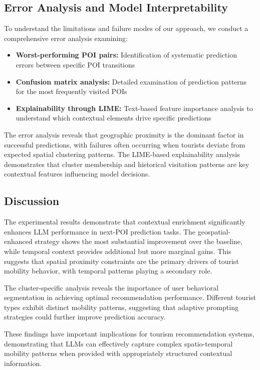 \documentclass[12pt,a4paper]{article}
\begin{document}
\subsection{Error Analysis and Model Interpretability}

To understand the limitations and failure modes of our approach, we conduct a comprehensive error analysis examining:

\begin{itemize}
\item \textbf{Worst-performing POI pairs:} Identification of systematic prediction errors between specific POI transitions
\item \textbf{Confusion matrix analysis:} Detailed examination of prediction patterns for the most frequently visited POIs
\item \textbf{Explainability through LIME:} Text-based feature importance analysis to understand which contextual elements drive specific predictions
\end{itemize}

The error analysis reveals that geographic proximity is the dominant factor in successful predictions, with failures often occurring when tourists deviate from expected spatial clustering patterns. The LIME-based explainability analysis demonstrates that cluster membership and historical visitation patterns are key contextual features influencing model decisions.

\subsection{Discussion}

The experimental results demonstrate that contextual enrichment significantly enhances LLM performance in next-POI prediction tasks. The geospatial-enhanced strategy shows the most substantial improvement over the baseline, while temporal context provides additional but more marginal gains. This suggests that spatial proximity constraints are the primary drivers of tourist mobility behavior, with temporal patterns playing a secondary role.

The cluster-specific analysis reveals the importance of user behavioral segmentation in achieving optimal recommendation performance. Different tourist types exhibit distinct mobility patterns, suggesting that adaptive prompting strategies could further improve prediction accuracy.

These findings have important implications for tourism recommendation systems, demonstrating that LLMs can effectively capture complex spatio-temporal mobility patterns when provided with appropriately structured contextual information.
\end{document}
